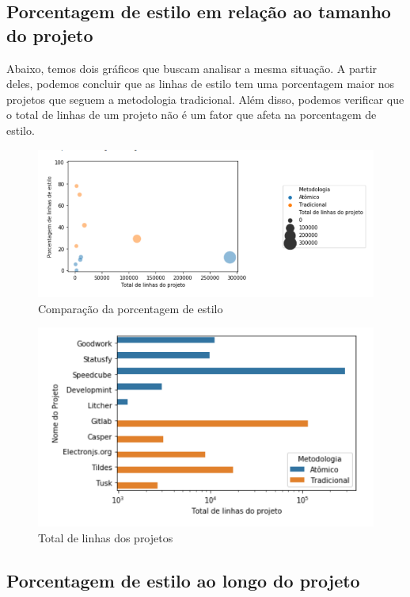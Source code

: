 \newpage

\hypertarget{porcentagem de estilo}{%
\subsection{Porcentagem de estilo em relação ao tamanho do projeto}\label{parcel}}

Abaixo, temos dois gráficos que buscam analisar a mesma situação. A partir deles, podemos concluir que as linhas de estilo tem uma porcentagem maior nos projetos que seguem a metodologia tradicional. Além disso, podemos verificar que o total de linhas de um projeto não é um fator que afeta na porcentagem de estilo.

\begin{figure}[H]
\centering
\includegraphics{figuras/porcentagem-linhas-estilo.png}
\caption{Comparação da porcentagem de estilo}
\end{figure}

\begin{figure}[H]
\centering
\includegraphics{figuras/tamanho-projeto.png}
\caption{Total de linhas dos projetos}
\end{figure}


\hypertarget{porcentagem de estilo}{%
\subsection{Porcentagem de estilo ao longo do projeto}\label{parcel}}

